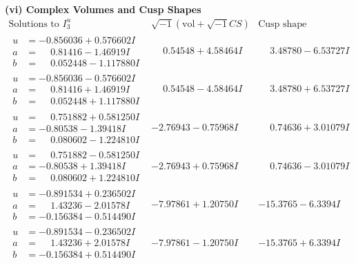 \documentclass[1p]{elsarticle_modified}
\theoremstyle{definition}
\newcommand{\I}{\sqrt{-1}}
\begin{document}
\newpage\flushleft \textbf{(vi) Complex Volumes and Cusp Shapes}
$$\begin{array}{c|c|c}  
\text{Solutions to }I^u_{3}& \I (\text{vol} + \sqrt{-1}CS) & \text{Cusp shape}\\
 \hline 
\begin{aligned}
u &= -0.856036 + 0.576602 I \\
a &= \phantom{-}0.81416 - 1.46919 I \\
b &= \phantom{-}0.052448 - 1.117880 I\end{aligned}
 & \phantom{-}0.54548 + 4.58464 I & \phantom{-}3.48780 - 6.53727 I \\ \hline\begin{aligned}
u &= -0.856036 - 0.576602 I \\
a &= \phantom{-}0.81416 + 1.46919 I \\
b &= \phantom{-}0.052448 + 1.117880 I\end{aligned}
 & \phantom{-}0.54548 - 4.58464 I & \phantom{-}3.48780 + 6.53727 I \\ \hline\begin{aligned}
u &= \phantom{-}0.751882 + 0.581250 I \\
a &= -0.80538 - 1.39418 I \\
b &= \phantom{-}0.080602 - 1.224810 I\end{aligned}
 & -2.76943 - 0.75968 I & \phantom{-}0.74636 + 3.01079 I \\ \hline\begin{aligned}
u &= \phantom{-}0.751882 - 0.581250 I \\
a &= -0.80538 + 1.39418 I \\
b &= \phantom{-}0.080602 + 1.224810 I\end{aligned}
 & -2.76943 + 0.75968 I & \phantom{-}0.74636 - 3.01079 I \\ \hline\begin{aligned}
u &= -0.891534 + 0.236502 I \\
a &= \phantom{-}1.43236 - 2.01578 I \\
b &= -0.156384 - 0.514490 I\end{aligned}
 & -7.97861 + 1.20750 I & -15.3765 - 6.3394 I \\ \hline\begin{aligned}
u &= -0.891534 - 0.236502 I \\
a &= \phantom{-}1.43236 + 2.01578 I \\
b &= -0.156384 + 0.514490 I\end{aligned}
 & -7.97861 - 1.20750 I & -15.3765 + 6.3394 I \\ \hline\begin{aligned}

\end{aligned}
\end{array}$$
\end{document}
